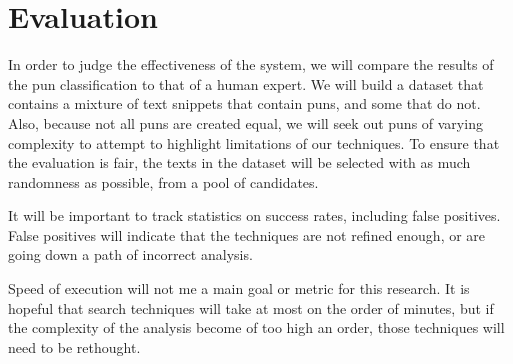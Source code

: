 \section{Evaluation}

In order to judge the effectiveness of the system, we will compare the results of the pun classification to that of a human expert. We will build a dataset that contains a mixture of text snippets that contain puns, and some that do not. Also, because not all puns are created equal, we will seek out puns of varying complexity to attempt to highlight limitations of our techniques. To ensure that the evaluation is fair, the texts in the dataset will be selected with as much randomness as possible, from a pool of candidates.

It will be important to track statistics on success rates, including false positives. False positives will indicate that the techniques are not refined enough, or are going down a path of incorrect analysis.

Speed of execution will not me a main goal or metric for this research. It is hopeful that search techniques will take at most on the order of minutes, but if the complexity of the analysis become of too high an order, those techniques will need to be rethought.

